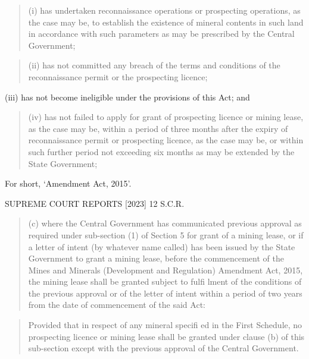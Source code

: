 \documentclass[12pt,a4paper]{article}
\newenvironment{judgequote}
  {\begin{quote}\small}
  {\end{quote}}
\begin{document}
\begin{judgequote}
(i) has undertaken reconnaissance operations or prospecting operations,
as the case may be, to establish the existence of mineral contents in
such land in accordance with such parameters as may be prescribed
by the Central Government;
\end{judgequote}

\begin{judgequote}
(ii) has not committed any breach of the terms and conditions of the
reconnaissance permit or the prospecting licence;
\end{judgequote}

\noindent (iii) has not become ineligible under the provisions of this Act; and


\begin{judgequote}
(iv) has not failed to apply for grant of prospecting licence or mining
lease, as the case may be, within a period of three months after the
expiry of reconnaissance permit or prospecting licence, as the case
may be, or within such further period not exceeding six months as
may be extended by the State Government;
\end{judgequote}

 For short, `Amendment Act, 2015'.




 SUPREME COURT REPORTS [2023] 12 S.C.R.


\begin{judgequote}
(c) where the Central Government has communicated previous
approval as required under sub-section (1) of Section 5 for grant of
a mining lease, or if a letter of intent (by whatever name called) has
been issued by the State Government to grant a mining lease, before
the commencement of the Mines and Minerals (Development and
Regulation) Amendment Act, 2015, the mining lease shall be granted
subject to fulfi lment of the conditions of the previous approval or
of the letter of intent within a period of two years from the date of
commencement of the said Act:
\end{judgequote}

\begin{judgequote}
Provided that in respect of any mineral specifi ed in the First Schedule,
no prospecting licence or mining lease shall be granted under clause
(b) of this sub-section except with the previous approval of the Central
Government.
\end{judgequote}
\end{document}
